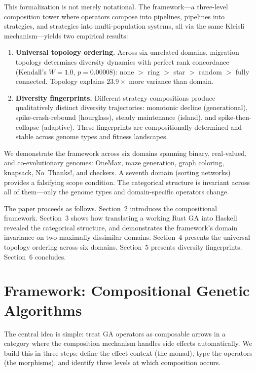 \documentclass[dvipsnames,format=sigconf,anonymous=true,review=true]{acmart}
\begin{document}
This formalization is not merely notational. The framework---a three-level composition tower where operators compose into pipelines, pipelines into strategies, and strategies into multi-population systems, all via the same Kleisli mechanism---yields two empirical results:

\begin{enumerate}[nosep]
  \item \textbf{Universal topology ordering.} Across six unrelated domains, migration topology determines diversity dynamics with perfect rank concordance (Kendall's $W = 1.0$, $p = 0.00008$): none $>$ ring $>$ star $>$ random $>$ fully connected. Topology explains $23.9\times$ more variance than domain.

  \item \textbf{Diversity fingerprints.} Different strategy compositions produce qualitatively distinct diversity trajectories: monotonic decline (generational), spike-crash-rebound (hourglass), steady maintenance (island), and spike-then-collapse (adaptive). These fingerprints are compositionally determined and stable across genome types and fitness landscapes.
\end{enumerate}

We demonstrate the framework across six domains spanning binary, real-valued, and co-evolutionary genomes: OneMax, maze generation, graph coloring, knapsack, No~Thanks!, and checkers. A seventh domain (sorting networks) provides a falsifying scope condition. The categorical structure is invariant across all of them---only the genome types and domain-specific operators change.

The paper proceeds as follows. Section~2 introduces the compositional framework. Section~3 shows how translating a working Rust GA into Haskell revealed the categorical structure, and demonstrates the framework's domain invariance on two maximally dissimilar domains. Section~4 presents the universal topology ordering across six domains. Section~5 presents diversity fingerprints. Section~6 concludes.

\section{Framework: Compositional Genetic Algorithms}

The central idea is simple: treat GA operators as composable arrows in a category where the composition mechanism handles side effects automatically. We build this in three steps: define the effect context (the monad), type the operators (the morphisms), and identify three levels at which composition occurs.
\end{document}
